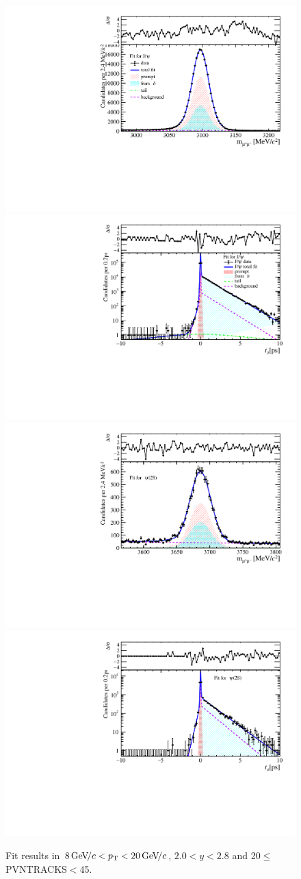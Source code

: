 \begin{figure}[H]
\begin{center}
\includegraphics[width=0.47\linewidth]{pdf/Jpsi/drawmass/n2y1pt5.pdf}
\includegraphics[width=0.47\linewidth]{pdf/Jpsi/2DFit/n2y1pt5.pdf}
\vspace*{-0.5cm}
\includegraphics[width=0.47\linewidth]{pdf/Psi2S/drawmass/n2y1pt5.pdf}
\includegraphics[width=0.47\linewidth]{pdf/Psi2S/2DFit/n2y1pt5.pdf}
\vspace*{-0.5cm}
\end{center}
\caption{Fit results in $8\text{\,Ge\kern -0.1em V\!/}c<p_{\mathrm{T}}<20\text{\,Ge\kern -0.1em V\!/}c$, $2.0<y<2.8$ and 20$\leq$PVNTRACKS$<$45.}
\label{Fitn2y1pt5}
\end{figure}

